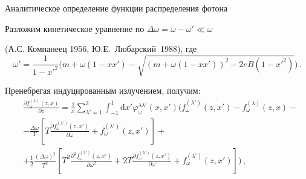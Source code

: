 \documentclass{beamer}
\newcommand{\dd}{\mathrm{d}}
\begin{document}
\begin{frame}
	{ \small Аналитическое определение функции распределения фотона}
	 
	Разложим кинетическое уравнение по 
	$\Delta\omega=\omega-\omega'\ll\omega$ 
	
	(А.С. Компанеец 1956, 
	Ю.Е.~Любарский~1988), где 
	\begin{equation}\nonumber
	\omega' = \frac{1}{1-x'^2}\bigg(m+\omega(1-x x')	
	- \sqrt{(m+\omega(1-x x'))^2 - 2eB (1-x'^2)}\bigg)\, .
	\end{equation}
		
		Пренебрегая индуцированным излучением, получим:
	\begin{equation}\label{eq:KinSerDeltaw}\begin{aligned}\nonumber
	&\frac{\partial f^{(\lambda)}_\omega(z,x)}{\partial z} = \frac{1}{x} \sum_{\lambda'=1}^{2} \int_{-1}^{1}\dd x'\varphi_\omega^{\lambda\lambda'}(x,x') \bigg(f_\omega^{(\lambda')}(z,x')-f_\omega^{(\lambda)}(z,x)-
	\\
	&- \frac{\Delta \omega}{T}
	\left[
	T \frac{\partial f_\omega^{(\lambda')}(z,x')}{\partial \omega} + f_\omega^{(\lambda')}(z,x')
	\right]+
	\\
	&+ \frac{1}{2}\frac{(\Delta \omega)^2}{T^2}
	\left[
	T^2 \frac{\partial^2 f_\omega^{(\lambda')}(z,x')}{\partial \omega^2} + 2T \frac{\partial f_\omega^{(\lambda')}(z,x')}{\partial \omega}+f_\omega^{(\lambda')}(z,x')
	\right]\bigg)\, ,
	\end{aligned}
	\end{equation}
\end{frame}

\end{document}
